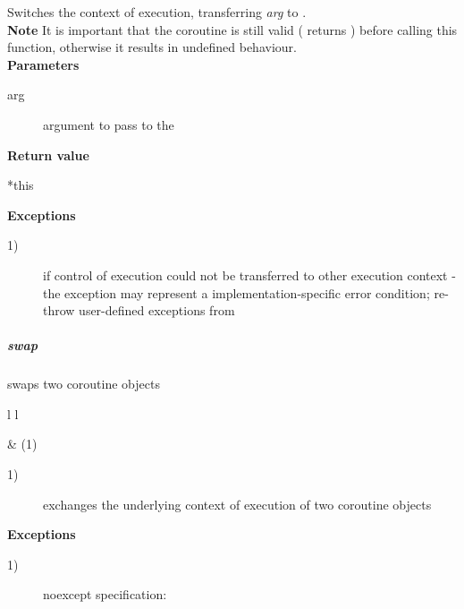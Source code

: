 Switches the context of execution, transferring \textit{arg} to \corofunction.\\

{\bf Note}
\newline
It is important that the coroutine is still valid (
returns ) before calling this function, otherwise it results in
undefined behaviour.\\

{\bf Parameters}
\begin{description}
    \item[arg] argument to pass to the \corofunction\\
\end{description}

{\bf Return value}
\begin{description}
    \item[*this]
\end{description}

{\bf Exceptions}
\begin{description}
    \item[1)]  if control of execution could not be
              transferred to other execution context - the exception may
              represent a implementation-specific error condition; re-throw
              user-defined exceptions from \corofunction\\
\end{description}

\subparagraph*{swap}
swaps two coroutine objects\\

\begin{tabular}{ l l }
    \midrule

     & (1)\\

    \midrule
\end{tabular}

\begin{description}
    \item[1)] exchanges the underlying context of execution of two coroutine objects\\
\end{description}

{\bf Exceptions}
\begin{description}
    \item[1)] noexcept specification: \\
\end{description}


